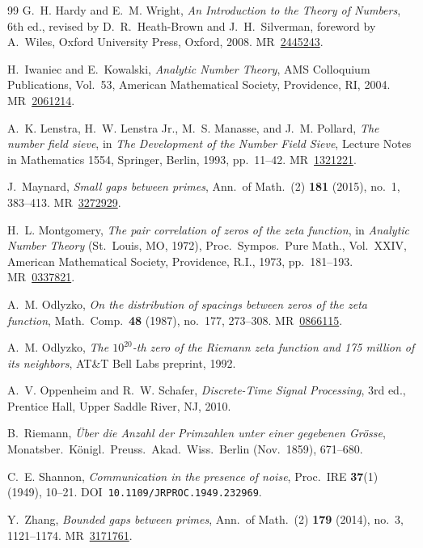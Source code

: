 \documentclass[11pt,reqno]{amsart}
\theoremstyle{plain}
\theoremstyle{definition}
\theoremstyle{remark}
\begin{document}
\begin{thebibliography}{99}
G.~H. Hardy and E.~M. Wright, \emph{An Introduction to the Theory
of Numbers}, 6th ed., revised by D.~R.~Heath-Brown and J.~H.~Silverman,
foreword by A.~Wiles, Oxford University Press, Oxford, 2008.
\textsc{MR}~\href{https://mathscinet.ams.org/mathscinet-getitem?mr=2445243}{2445243}.

H.~Iwaniec and E.~Kowalski, \emph{Analytic Number Theory}, AMS
Colloquium Publications, Vol.\ 53, American Mathematical Society,
Providence, RI, 2004.
\textsc{MR}~\href{https://mathscinet.ams.org/mathscinet-getitem?mr=2061214}{2061214}.

A.~K. Lenstra, H.~W. Lenstra Jr., M.~S. Manasse, and J.~M. Pollard,
\emph{The number field sieve}, in \emph{The Development of the
Number Field Sieve}, Lecture Notes in Mathematics 1554,
Springer, Berlin, 1993, pp.~11--42.
\textsc{MR}~\href{https://mathscinet.ams.org/mathscinet-getitem?mr=1321221}{1321221}.

J.~Maynard, \emph{Small gaps between primes}, Ann.\ of Math.\ (2)
\textbf{181} (2015), no.~1, 383--413.
\textsc{MR}~\href{https://mathscinet.ams.org/mathscinet-getitem?mr=3272929}{3272929}.

H.~L. Montgomery, \emph{The pair correlation of zeros of the zeta
function}, in \emph{Analytic Number Theory} (St.~Louis, MO, 1972),
Proc.~Sympos.~Pure Math., Vol.~XXIV, American Mathematical Society,
Providence, R.I., 1973, pp.~181--193.
\textsc{MR}~\href{https://mathscinet.ams.org/mathscinet-getitem?mr=0337821}{0337821}.

A.~M. Odlyzko, \emph{On the distribution of spacings between zeros
of the zeta function}, Math.\ Comp.\ \textbf{48} (1987), no.~177,
273--308.
\textsc{MR}~\href{https://mathscinet.ams.org/mathscinet-getitem?mr=0866115}{0866115}.

A.~M. Odlyzko, \emph{The $10^{20}$-th zero of the Riemann zeta
function and 175 million of its neighbors}, AT\&T Bell Labs preprint,
1992.

A.~V. Oppenheim and R.~W. Schafer, \emph{Discrete-Time Signal
Processing}, 3rd ed., Prentice Hall, Upper Saddle River, NJ, 2010.

B.~Riemann, \emph{\"Uber die Anzahl der Primzahlen unter einer
gegebenen Gr\"osse}, Monatsber.\ K\"onigl.\ Preuss.\ Akad.\ Wiss.\
Berlin (Nov.~1859), 671--680.

C.~E. Shannon, \emph{Communication in the presence of noise},
Proc.~IRE \textbf{37}(1) (1949), 10--21.
DOI~\texttt{10.1109/JRPROC.1949.232969}.

Y.~Zhang, \emph{Bounded gaps between primes}, Ann.\ of Math.\ (2)
\textbf{179} (2014), no.~3, 1121--1174.
\textsc{MR}~\href{https://mathscinet.ams.org/mathscinet-getitem?mr=3171761}{3171761}.

\end{thebibliography}
\end{document}

